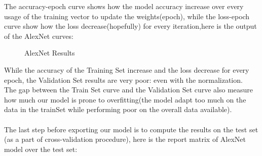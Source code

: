 \documentclass{article}
\begin{document}
The accuracy-epoch curve shows how the model accuracy increase over every usage of the training vector to update the weights(epoch), while the loss-epoch curve show how the loss decrease(hopefully) for every iteration,here is the output of the AlexNet curves:

\begin{figure}[h]
\centering
{}%
\hfill %
%
\caption{AlexNet Results}
\end{figure}

While the accuracy of the Training Set increase and the loss decrease for every epoch, the Validation Set results are very poor: even with the normalization.\\
The gap between the Train Set curve and the Validation Set curve also measure how much our model is prone to overfitting(the model adapt too much on the data  in the trainSet while performing poor on the overall data available).\\\\
The last step before exporting our model is to compute the results on the test set (as a part of cross-validation procedure), here is the report matrix of AlexNet model over the test set:
\end{document}
